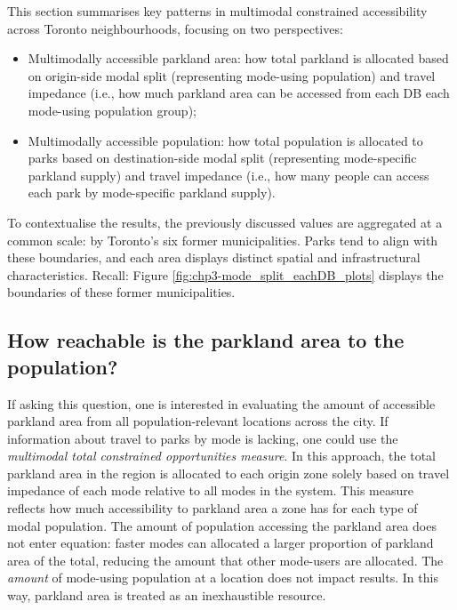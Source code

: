 \documentclass[
11pt, %
oneside, %
english, %
singlespacing, %
]{macthesis} %
\def\tightlist{}
\begin{document}
This section summarises key patterns in multimodal constrained accessibility across Toronto neighbourhoods, focusing on two perspectives:

\begin{itemize}
\tightlist
\item
  Multimodally accessible parkland area: how total parkland is allocated based on origin-side modal split (representing mode-using population) and travel impedance (i.e., how much parkland area can be accessed from each DB each mode-using population group);
\item
  Multimodally accessible population: how total population is allocated to parks based on destination-side modal split (representing mode-specific parkland supply) and travel impedance (i.e., how many people can access each park by mode-specific parkland supply).
\end{itemize}

To contextualise the results, the previously discussed values are aggregated at a common scale: by Toronto's six former municipalities. Parks tend to align with these boundaries, and each area displays distinct spatial and infrastructural characteristics. Recall: Figure \ref{fig:chp3-mode_split_eachDB_plots} displays the boundaries of these former municipalities.

\subsection{\texorpdfstring{\textbf{How reachable is the parkland area to the population?}}{How reachable is the parkland area to the population?}}\label{how-reachable-is-the-parkland-area-to-the-population}

If asking this question, one is interested in evaluating the amount of accessible parkland area from all population-relevant locations across the city. If information about travel to parks by mode is lacking, one could use the \emph{multimodal total constrained opportunities measure}. In this approach, the total parkland area in the region is allocated to each origin zone solely based on travel impedance of each mode relative to all modes in the system. This measure reflects how much accessibility to parkland area a zone has for each type of modal population. The amount of population accessing the parkland area does not enter equation: faster modes can allocated a larger proportion of parkland area of the total, reducing the amount that other mode-users are allocated. The \emph{amount} of mode-using population at a location does not impact results. In this way, parkland area is treated as an inexhaustible resource.
\end{document}
